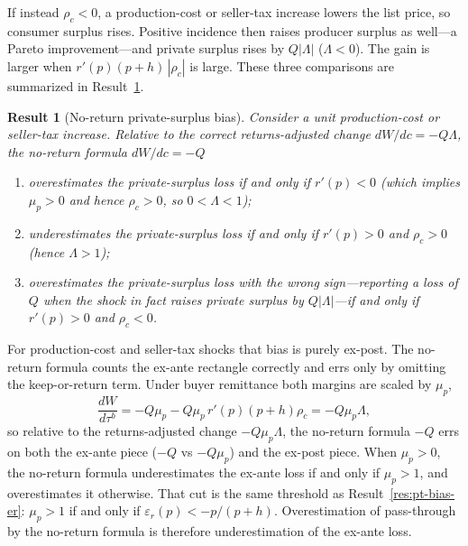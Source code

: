 \documentclass[11pt]{article}
\newtheorem{result}{Result}
\begin{document}
If instead $\rho_c<0$, a production-cost or seller-tax increase lowers the
list price, so consumer surplus rises.  Positive incidence then raises
producer surplus as well---a Pareto improvement---and private surplus rises
by $Q|\Lambda|$ ($\Lambda<0$).  The gain is larger when
$r'(p)(p+h)\,|\rho_c|$ is large.  These three comparisons are summarized in
Result~\ref{res:welfare-bias}.
\begin{result}[No-return private-surplus bias]
\label{res:welfare-bias}
  Consider a unit production-cost or seller-tax increase.  Relative to the
  correct returns-adjusted change $dW/dc=-Q\Lambda$, the no-return formula
  $dW/dc=-Q$
  \begin{enumerate}
  \item[(i)] overestimates the private-surplus loss if and only if
  $r'(p)<0$ (which implies $\mu_p>0$ and hence $\rho_c>0$, so
  $0<\Lambda<1$);
  \item[(ii)] underestimates the private-surplus loss if and only if
  $r'(p)>0$ and $\rho_c>0$ (hence $\Lambda>1$);
  \item[(iii)] overestimates the private-surplus loss with the wrong
  sign---reporting a loss of $Q$ when the shock in fact raises private
  surplus by $Q|\Lambda|$---if and only if $r'(p)>0$ and $\rho_c<0$.
  \end{enumerate}
\end{result}
For production-cost and seller-tax shocks that bias is purely ex-post.  The
no-return formula counts the ex-ante rectangle correctly and errs only by
omitting the keep-or-return term.  Under buyer remittance both margins are
scaled by $\mu_p$,
\begin{equation}
  \frac{dW}{d\tau^b}
  =-Q\mu_p
  -Q\mu_p\,r'(p)(p+h)\rho_c
  =-Q\mu_p\Lambda,
\end{equation}
so relative to the returns-adjusted change $-Q\mu_p\Lambda$, the no-return
formula $-Q$ errs on both the ex-ante piece ($-Q$ vs $-Q\mu_p$) and the
ex-post piece.  When $\mu_p>0$, the no-return formula underestimates the
ex-ante loss if and only if $\mu_p>1$, and overestimates it otherwise.  That
cut is the same threshold as Result~\ref{res:pt-bias-er}: $\mu_p>1$ if and
only if $\varepsilon_r(p)<-p/(p+h)$.  Overestimation of pass-through by the
no-return formula is therefore underestimation of the ex-ante loss.
\end{document}
